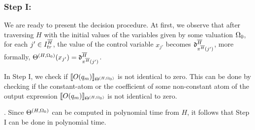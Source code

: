 \subsubsection{Step I:} 
We are ready to present the decision procedure. At first, we observe that  after traversing $H$ with the initial values of the variables given by some valuation $\Omega_0$, for each $j' \in I^{\overline{H}}_{tr}$, the value of the control variable $x_{j'}$ becomes $\mathfrak{d}^{\overline{H}}_{\pi^{\overline{H}}(j')}$,  more formally, $\Theta^{(H,\Omega_0)}(x_{j'})=\mathfrak{d}^{\overline{H}}_{\pi^{\overline{H}}(j')}$.

In Step I, we check if $\llbracket O(q_m)\rrbracket_{\Theta^{(H,\Omega_0)}}$ is not identical to zero.
This can be done by checking if the constant-atom or the coefficient of some non-constant atom of the output expression $\llbracket O(q_m)\rrbracket_{\Theta^{(H,\Omega_0)}}$ is not identical to zero.
%
\bigskip\\
\medskip

. Since $\Theta^{(H,\Omega_0)}$ can be computed in polynomial time from $H$, it follows that Step I can be done in polynomial time.

